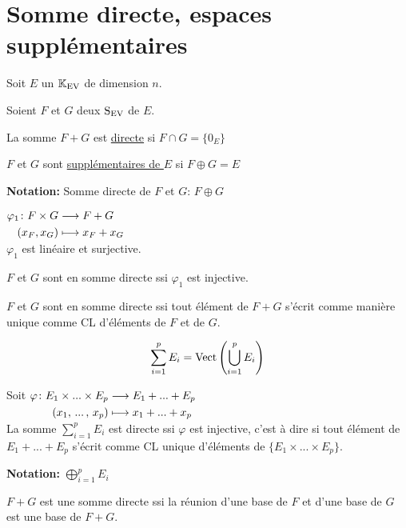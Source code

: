 \documentclass[12pt,twoside,a4paper]{article}
\begin{document}
	\section{Somme directe, espaces suppl\'ementaires}
		\begin{flushleft}
			Soit $E$ un $\mathbb{K}_\mathrm{EV}$ de dimension $n$.
		\end{flushleft}
		\begin{defi}
			Soient $F$ et $G$ deux $\mathrm{S}_\mathrm{EV}$ de $E$.
			\begin{liste}
				\item La somme $F+G$ est \underline{directe} si $F\cap G=\{0_E\}$
				\item $F$ et $G$ sont \underline{suppl\'ementaires de $E$} si $F\oplus G=E$
			\end{liste}
		\end{defi}
		\begin{flushleft}
			\textbf{Notation:} Somme directe de $F$ et $G$: $F\oplus G$
		\end{flushleft}
		\begin{prop}
			$\begin{aligned}[t]\varphi_1\colon F\times G&\longrightarrow F+G \\(x_F,x_G)&\longmapsto x_F+x_G\end{aligned}$\\
			$\varphi_1$ est lin\'eaire et surjective.\\
			\begin{liste}
				\item $F$ et $G$ sont en somme directe ssi $\varphi_1$ est injective.
				\item $F$ et $G$ sont en somme directe ssi tout \'el\'ement de $F+G$ s'\'ecrit comme mani\`ere unique comme CL d'\'el\'ements de $F$ et de $G$.
			\end{liste}
		\end{prop}
		\begin{defi}
			$$\sum\limits_{i=1}^pE_i=\mathrm{Vect}\left( \bigcup\limits_{i=1}^pE_i\right) $$
		\end{defi}
		\begin{defi}
			Soit $\begin{aligned}[t]\varphi\colon E_1\times...\times E_p&\longrightarrow E_1+...+E_p \\(x_1,\,...\,,\,x_p)&\longmapsto x_1+...+x_p\end{aligned}$\\
			La somme $\sum\limits_{i=1}^pE_i$ est directe ssi $\varphi$ est injective, c'est \`a dire si tout \'el\'ement de $E_1+...+E_p$ s'\'ecrit comme CL unique d'\'el\'ements de $\{E_1\times...\times E_p\}$.
		\end{defi}
		\begin{flushleft}
			\textbf{Notation:} $\bigoplus\limits_{i=1}^pE_i$
		\end{flushleft}
		\begin{prop}
			$F+G$ est une somme directe ssi la r\'eunion d'une base de $F$ et d'une base de $G$ est une base de $F+G$.
		\end{prop}
\end{document}
